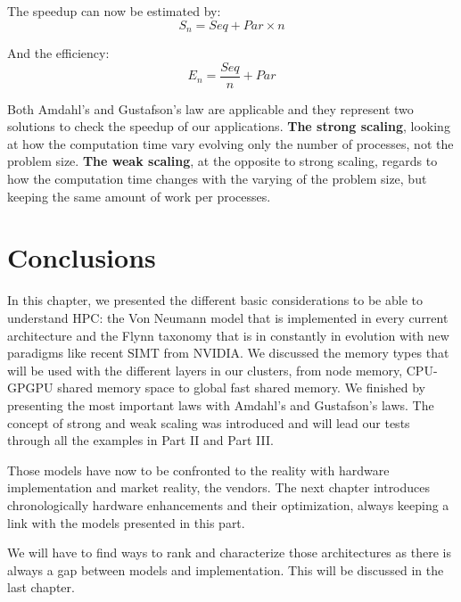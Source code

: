 The speedup can now be estimated by:
\begin{equation}
S_n = Seq + Par \times n
\end{equation}

And the efficiency: 
\begin{equation}
E_n = \frac{Seq}{n} + Par
\end{equation}


Both Amdahl's and Gustafson's law are applicable and they represent two solutions to check the speedup of our applications. 
\textbf{The strong scaling}, looking at how the computation time vary evolving only the number of processes, not the problem size. 
\textbf{The weak scaling}, at the opposite to strong scaling, regards to how the computation time changes with the varying of the problem size, but keeping the same amount of work per processes. 

\section{Conclusions}

In this chapter, we presented the different basic considerations to be able to understand HPC: the Von Neumann model that is implemented in every current architecture and the Flynn taxonomy that is in constantly in evolution with new paradigms like recent SIMT from NVIDIA. 
We discussed the memory types that will be used with the different layers in our clusters, from node memory, CPU-GPGPU shared memory space to global fast shared memory. 
We finished by presenting the most important laws with Amdahl's and Gustafson's laws.
The concept of strong and weak scaling was introduced and will lead our tests through all the examples in Part II and Part III.

Those models have now to be confronted to the reality with hardware implementation and market reality, the vendors. 
The next chapter introduces chronologically hardware enhancements and their optimization, always keeping a link with the models presented in this part.

We will have to find ways to rank and characterize those architectures as there is always a gap between models and implementation. 
This will be discussed in the last chapter.


